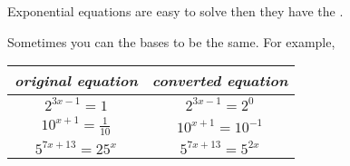     Exponential equations are easy to solve then they have the 
     .

    Sometimes you can  the bases to be the same. 
    For example,

    \begin{center} 
        \renewcommand{\arraystretch}{1.5}
        \begin{tabular}{c|c}
            \toprule
            {\itshape original equation} & {\itshape converted equation} \\
            \midrule 
            $ 2^{3x-1} = 1 $   &   $2^{3x-1} = 2^0$ \\
            $ 10^{x+1} = \frac{1}{10} $   &   $10^{x+1} = 10^{-1}$ \\
            $ 5^{7x+13} = 25^x $   &   $5^{7x+13} = 5^{2x}$ \\
            \bottomrule
        \end{tabular}
    \end{center}


